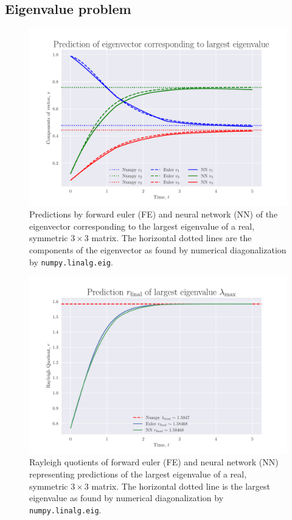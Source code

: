 \documentclass[12pt]{extarticle}
\def\code#1{\texttt{#1}}
\begin{document}
\subsection{Eigenvalue problem}


\begin{figure}[h!]
	\centering
	\includegraphics[scale=0.75]{../output/plots/eigvec_T5_N1000.pdf}
	\caption{Predictions by forward euler (FE) and neural network (NN) of the eigenvector corresponding to the largest eigenvalue of a real, symmetric $3\times 3$ matrix. The horizontal dotted lines are the components of the eigenvector as found by numerical diagonalization by \code{numpy.linalg.eig}.}
	\label{fig:eigvec_T5_N1000}
\end{figure}

\begin{figure}[h!]
	\centering
	\includegraphics[scale=0.75]{../output/plots/eigval_T5_N1000.pdf}
	\caption{Rayleigh quotients of forward euler (FE) and neural network (NN) representing predictions of the largest eigenvalue of a real, symmetric $3\times 3$ matrix. The horizontal dotted line is the largest eigenvalue as found by numerical diagonalization by \code{numpy.linalg.eig}.}
	\label{fig:eigval_T5_N1000}
\end{figure}
\end{document}
